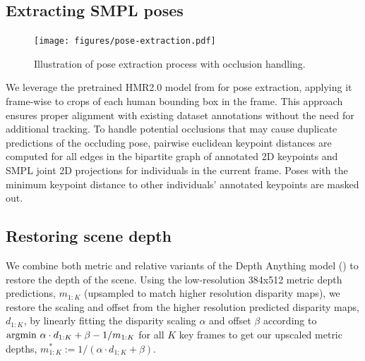 

\subsection*{Extracting SMPL poses}
\begin{figure}[H]
    \centering
    \texttt{[image: figures/pose-extraction.pdf]}
    \caption{Illustration of pose extraction process with occlusion handling.}
    \label{fig:pose-extraction}
\end{figure}
We leverage the pretrained HMR2.0 model from \cite{goel2023humans} for pose extraction, applying it frame-wise to crops of each human bounding box in the frame. This approach ensures proper alignment with existing dataset annotations without the need for additional tracking. To handle potential occlusions that may cause duplicate predictions of the occluding pose, pairwise euclidean keypoint distances are computed for all edges in the bipartite graph of annotated 2D keypoints and SMPL joint 2D projections for individuals in the current frame. Poses with the minimum keypoint distance to other individuals' annotated keypoints are masked out.




\subsection*{Restoring scene depth}
We combine both metric and relative variants of the Depth Anything model (\cite{depthanything}) to restore the depth of the scene. Using the low-resolution 384x512 metric depth predictions, $m_{1:K}$ (upsampled to match higher resolution disparity maps), we restore the scaling and offset from the higher resolution predicted disparity maps, $d_{1:K}$, by linearly fitting the disparity scaling $\alpha$ and offset $\beta$ according to $\operatorname*{argmin\,} \alpha \cdot d_{1:K} + \beta - 1 / m_{1:K}$ for all $K$ key frames to get our upscaled metric depths, $m^*_{1:K} := 1 / (\alpha \cdot d_{1:K} + \beta)$.

